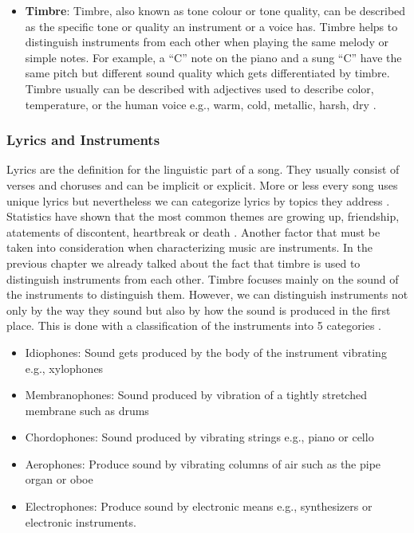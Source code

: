 \begin{itemize}
    \item \textbf{Timbre}: Timbre, also known as tone colour or tone quality,
    can be described as the specific tone or quality an instrument or a voice has.
    Timbre helps to distinguish instruments from each other when playing the same melody or simple notes.
    For example, a “C” note on the piano and a sung “C” have the same pitch but different sound
    quality which gets differentiated by timbre.
    Timbre usually can be described with adjectives used to describe color, temperature,
    or the human voice e.g., warm, cold, metallic, harsh, dry \cite[94]{Hemming2015}.

\end{itemize}

\subsubsection{Lyrics and Instruments}

Lyrics are the definition for the linguistic part of a song.
They usually consist of verses and choruses and can be implicit or explicit.
More or less every song uses unique lyrics but nevertheless we can categorize lyrics by topics they address \cite{Shipman2014Analysis}.
Statistics have shown that the most common themes are growing up, friendship, atatements of discontent,
heartbreak or death \cite{2020AIMMListening}.
Another factor that must be taken into consideration when characterizing music are instruments.
In the previous chapter we already talked about the fact that timbre is used to distinguish instruments
from each other.
Timbre focuses mainly on the sound of the instruments to distinguish them.
However, we can distinguish instruments not only by the way they sound but also by how the sound is produced
in the first place.
This is done with a classification of the instruments into 5 categories \cite{GoshenInstrumentClass}.

\begin{itemize}
    \item Idiophones: Sound gets produced by the body of the instrument vibrating e.g., xylophones
    \item Membranophones: Sound produced by vibration of a tightly stretched membrane such as drums
    \item Chordophones: Sound produced by vibrating strings e.g., piano or cello
    \item Aerophones: Produce sound by vibrating columns of air such as the pipe organ or oboe
    \item Electrophones: Produce sound by electronic means e.g., synthesizers or electronic instruments.
\end{itemize}

